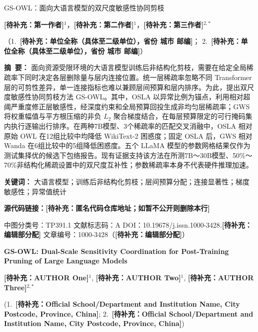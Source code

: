 \documentclass[UTF8,fontset=fandol]{ctexart}
\newcommand{\method}{GS-OWL}
\newcommand{\placeholder}[1]{\textbf{[待补充：#1]}}
\begin{document}

\begingroup
\setlength{\parindent}{0pt}
\begin{center}
{\heiti{} GS-OWL：面向大语言模型的双尺度敏感性协同剪枝\par}
\vspace{7pt}
{ \placeholder{第一作者}$^{1}$，\placeholder{第二作者}$^{1}$，\placeholder{第三作者}$^{2,*}$\par}
\vspace{4pt}
{
（1.\ \placeholder{单位全称（具体至二级单位），省份 城市 邮编}；
2.\ \placeholder{单位全称（具体至二级单位），省份 城市 邮编}）\par}
\end{center}

\vspace{5pt}
\noindent\textbf{摘\ 要：}
面向资源受限环境的大语言模型训练后非结构化剪枝，需要在给定全局稀疏率下同时决定各层删除量与层内连接位置。统一层稀疏率忽略不同 Transformer 层的可剪性差异，单一连接指标也难以兼顾层间预算和层内排序。为此，提出双尺度敏感性协同剪枝方法 \method。其中，OSLA 以异常比例为锚点，利用相对超阈严重度修正层敏感性，经深度约束和全局预算回投生成非均匀层稀疏率；GWS 将权重幅值与平方根压缩的非负 $L_2$ 聚合梯度结合，在每层预算限定的可行掩码集内执行逐输出行排序。在两种7B模型、3个稀疏率的匹配交叉消融中，OSLA 相对原始 OWL 在12组比较中均降低 WikiText-2 困惑度；固定 OSLA 后，GWS 相对 Wanda 在6组比较中的5组降低困惑度。五个 LLaMA 模型的参数网格结果仅作为测试集择优的候选下包络报告。现有证据支持该方法在所测7B～30B模型、50\%～70\%非结构化稀疏设置中的双尺度互补性；参数稀疏率本身不代表硬件推理加速。

\noindent\textbf{关键词：}
大语言模型；训练后非结构化剪枝；层间预算分配；连接显著性；梯度敏感性；异常值统计

\noindent\textbf{源代码链接：}\placeholder{匿名代码仓库地址；如暂不公开则删除本行}

\noindent 中图分类号：TP391.1 \qquad 文献标志码：A \qquad
DOI：10.19678/j.issn.1000-3428.\placeholder{编辑部分配} \qquad
文章编号：1000-3428（\placeholder{编辑部分配}）

\vspace{8pt}
\begin{center}
{\bfseries{} GS-OWL: Dual-Scale Sensitivity Coordination for Post-Training Pruning of Large Language Models\par}
\vspace{5pt}
{ \placeholder{AUTHOR One}$^{1}$, \placeholder{AUTHOR Two}$^{1}$, \placeholder{AUTHOR Three}$^{2,*}$\par}
\vspace{3pt}
{
(1.\ \placeholder{Official School/Department and Institution Name, City Postcode, Province, China};
2.\ \placeholder{Official School/Department and Institution Name, City Postcode, Province, China})\par}
\end{center}
\end{document}
